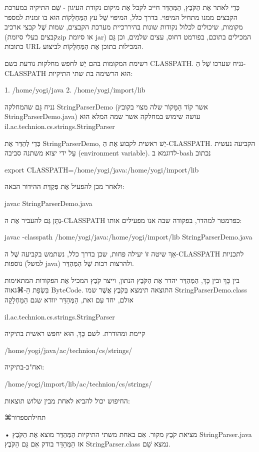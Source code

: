 כְּדֵי לאתר אֶת הַקֹּבֶץ, הַמְּהַדֵּר חייב לקבל אֶת מיקום נקודת העיגון - שֵׁם
התיקיה במערכת הקבצים ממנו מתחיל המיפוי. בדרך כלל, המיפוי שֶׁל עץ הַמַּחְלָקוֹת
הוּא בו זמנית למספר מקומות, שיכולים לכלול נקודות שונות בהיררכיית מערכת הקבצים,
שמות שֶׁל קבצי ארכיב (קבצים בעלי סיומתzip או סיומת jar) המכילים בתוכם, בפורמט
דחוס, עצים שלמים, וכן גַּם כתובות URL המכילות בתוכן אֶת הַמַּחְלָקוֹת לביצוע.

רשימת המקומות בהם יֵשׁ לחפש מחלקות נודעת בשם CLASSPATH. נניח שערכו שֶׁל
הַ-CLASSPATH הוּא הרשימה בת שתי התיקיות:

1. /home/yogi/java
2. /home/yogi/import/lib

נניח גַּם שהמחלקה StringParserDemo (אשר קוֹד הַמָּקוֹר שלה מצוי בקובץ
StringParserDemo.java) עושה שימוש במחלקה אשר שמה המלא הוּא
il.ac.technion.cs.strings.StringParser

כְּדֵי לְהַדֵּר אֶת StringParserDemo, יֵשׁ ראשית לקבוע אֶת הַ-CLASSPATH. הקביעה
נעשית עַל ידי יצוא משתנה סביבה (environment variable). לדוגמא ב-bash נכתוב

export CLASSPATH=/home/yogi/java:/home/yogi/import/lib

ולאחר מכן להפעיל אֶת פְּקֻדַּת ההידור הבאה:

javac StringParserDemo.java

נִתָּן גַּם להעביר אֶת ה-CLASSPATH כפרמטר למהדר, בפקודה שבה אנו מפעילים אותו:

javac -classpath /home/yogi/java:/home/yogi/import/lib StringParserDemo.java

אַךְ שיטה זוֹ יעילה פחות, שכן בדרך כלל, נשתמש בקביעה שֶׁל ה-CLASSPATH לתכניות
נוספות (למשל java) ולהרצות רבות שֶׁל הַמְּהַדֵּר.

בין כָּךְ ובין כָּךְ, הַמְּהַדֵּר יהדר אֶת הַקֹּבֶץ הנתון, וייצר קֹבֶץ המכיל אֶת
הפקודות המתאימות בִּשְׂפַת הַ-⌘גאוה ByteCode. התוצאה תימצא בְּקֹבֶץ אֲשֶׁר שמו
StringParserDemo.class אולם, יחד עִם זאת, הַמְּהַדֵּר יוודא שגם הַמַּחְלָקָה

 il.ac.technion.cs.strings.StringParser

קיימת ומהודרת. לשם כָּךְ, הוּא יחפש ראשית בתיקיה

/home/yogi/java/ac/technion/cs/strings/

ואח"כ-בתיקיה:

/home/yogi/import/lib/ac/technion/cs/strings/

החיפוש יכול להביא לאחת מבין שלוש תוצאות:

⌘תחילת{ספרור}

• מציאת קֹבֶץ מקור. אִם באחת משתי התיקיות הַמְּהַדֵּר מוצא אֶת הַקֹּבֶץ
StringParser.java אז הַמְּהַדֵּר בודק אִם גַּם הַקֹּבֶץ StringParser.class נמצא
שֵׁם.

